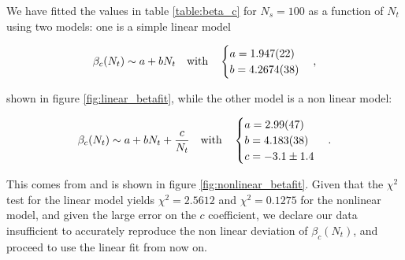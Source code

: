 \documentclass[reqno,12pt]{article}
\numberwithin{equation}{section}
\begin{document}
We have fitted the values in table \ref{table:beta_c} for $N_s = 100$ as a function of $N_t$
using two models: one is a simple linear model

\begin{equation} \label{eq:beta_fit}
	\beta_c(N_t) \sim a + bN_t \qq{with}
	\begin{cases}
		a = 1.947(22) \\
		b = 4.2674(38)
	\end{cases},
\end{equation}

shown in figure \ref{fig:linear_betafit}, while the other model is a non linear model:

\begin{equation}
	\beta_c(N_t) \sim a + b N_t + \frac{c}{N_t} \qq{with} 
	\begin{cases}
		a = 2.99(47) \\
		b = 4.183(38) \\
		c = -3.1 \pm 1.4
	\end{cases}.
\end{equation}

This comes from \cite{beta-fit} and is shown in figure \ref{fig:nonlinear_betafit}. Given that the $\chi^2$ test
for the linear model yields $\chi^2 = 2.5612$ and $\chi^2 = 0.1275$ for the nonlinear model, and given the large error
on the $c$ coefficient, we declare our data insufficient to accurately reproduce the non linear deviation of $\beta_c(N_t)$,
and proceed to use the linear fit from now on.
\end{document}
